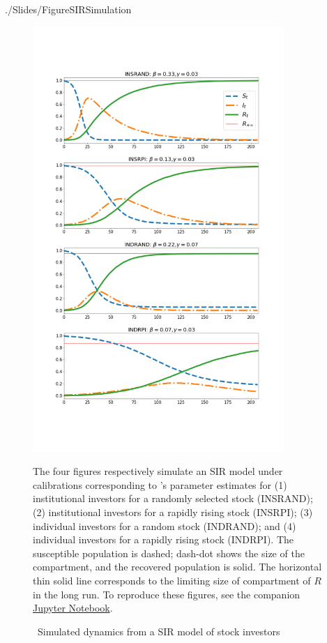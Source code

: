 \begin{verbatimwrite}{./Slides/FigureSIRSimulation}%
    \begin{figure} \centering  %
        \caption{ ~Simulated dynamics from a SIR model of stock investors}
        \label{fig:sir_simulate}
        \centerline{\includegraphics[width=0.85\textwidth,height=0.85\textheight]{./figures/sir_simulate}}
        \begin{flushleft}
            {\footnotesize The four figures respectively simulate an SIR model under calibrations corresponding to \cite{shiller1989survey}'s parameter estimates for (1) institutional investors for a randomly selected stock (INSRAND); (2) institutional investors for a rapidly rising stock (INSRPI); (3) individual investors for a random stock (INDRAND); and (4) individual investors for a rapidly rising stock (INDRPI). The susceptible population {\Susceptible} is dashed; dash-dot shows the size of the {\Infected} compartment, and the recovered population {\Recovered} is solid.  The horizontal thin solid line corresponds to the limiting size of compartment of $R$ in the long run.  To reproduce these figures, see the companion \href{https://github.com/llorracc/EpiExp/blob/master/SIR_Ndlib.ipynb}{Jupyter Notebook}. }
        \end{flushleft}
    \end{figure}
\end{verbatimwrite}%

